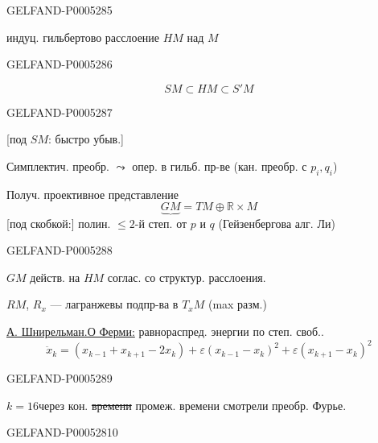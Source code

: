 \begin{GelfandAdjacentEvidence}{GELFAND-P000528}{5}

индуц. гильбертово расслоение $HM$ над $M$
\end{GelfandAdjacentEvidence}
\begin{GelfandAdjacentEvidence}{GELFAND-P000528}{6}

\[
SM\subset HM\subset S'M
\]
\end{GelfandAdjacentEvidence}
\begin{GelfandAdjacentEvidence}{GELFAND-P000528}{7}

[под $SM$: быстро убыв.]

Симплектич. преобр. $\leadsto$ опер. в гильб. пр-ве (кан. преобр. с $p_i,q_i$)

Получ. проективное представление
\[
\underbrace{GM}=TM\oplus\mathbb R\times M
\]
[под скобкой:] полин. $\leq2$-й степ. от $p$ и $q$ (Гейзенбергова алг. Ли)
\end{GelfandAdjacentEvidence}
\begin{GelfandAdjacentEvidence}{GELFAND-P000528}{8}


$GM$ действ. на $HM$ соглас. со структур. расслоения.

$RM$, $R_x$ — лагранжевы подпр-ва в $T_xM$ (max разм.)

\uline{А. Шнирельман.}\qquad\uline{О Ферми:} равнораспред. энергии по степ. своб..
\[
\ddot x_k=(x_{k-1}+x_{k+1}-2x_k)+\varepsilon(x_{k-1}-x_k)^2
 +\varepsilon(x_{k+1}-x_k)^2
\]
\end{GelfandAdjacentEvidence}
\begin{GelfandAdjacentEvidence}{GELFAND-P000528}{9}



\underline{$k=16$}\qquad через кон. \sout{времени} промеж. времени смотрели преобр. Фурье.
\end{GelfandAdjacentEvidence}
\begin{GelfandAdjacentEvidence}{GELFAND-P000528}{10}

\end{GelfandAdjacentEvidence}
